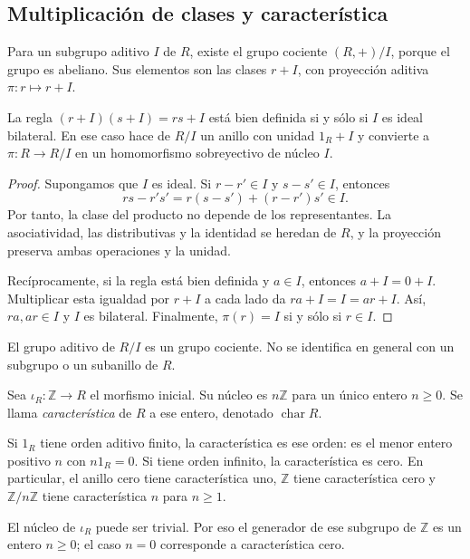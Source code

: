 \subsection{Multiplicación de clases y característica}
Para un subgrupo aditivo $I$ de $R$, existe el grupo cociente $(R,+)/I$, porque el grupo es abeliano. Sus elementos son las clases $r+I$, con proyección aditiva $\pi:r\mapsto r+I$.

\begin{prop}\label{prop:C12-cociente}
La regla $(r+I)(s+I)=rs+I$ está bien definida si y sólo si $I$ es ideal bilateral. En ese caso hace de $R/I$ un anillo con unidad $1_R+I$ y convierte a $\pi:R\to R/I$ en un homomorfismo sobreyectivo de núcleo $I$.
\end{prop}
\begin{proof}
Supongamos que $I$ es ideal. Si $r-r'\in I$ y $s-s'\in I$, entonces
\[
rs-r's'=r(s-s')+(r-r')s'\in I.
\]
Por tanto, la clase del producto no depende de los representantes. La asociatividad, las distributivas y la identidad se heredan de $R$, y la proyección preserva ambas operaciones y la unidad.

Recíprocamente, si la regla está bien definida y $a\in I$, entonces $a+I=0+I$. Multiplicar esta igualdad por $r+I$ a cada lado da $ra+I=I=ar+I$. Así, $ra,ar\in I$ y $I$ es bilateral. Finalmente, $\pi(r)=I$ si y sólo si $r\in I$.
\end{proof}
\begin{obs}
El grupo aditivo de $R/I$ es un grupo cociente. No se identifica en general con un subgrupo o un subanillo de $R$.
\end{obs}

\begin{defi}
Sea $\iota_R:\mathbb Z\to R$ el morfismo inicial. Su núcleo es $n\mathbb Z$ para un único entero $n\geq0$. Se llama \emph{característica} de $R$ a ese entero, denotado $\operatorname{char}R$.
\end{defi}
Si $1_R$ tiene orden aditivo finito, la característica es ese orden: es el menor entero positivo $n$ con $n1_R=0$. Si tiene orden infinito, la característica es cero. En particular, el anillo cero tiene característica uno, $\mathbb Z$ tiene característica cero y $\mathbb Z/n\mathbb Z$ tiene característica $n$ para $n\geq1$.
\begin{obs}
El núcleo de $\iota_R$ puede ser trivial. Por eso el generador de ese subgrupo de $\mathbb Z$ es un entero $n\geq0$; el caso $n=0$ corresponde a característica cero.
\end{obs}

